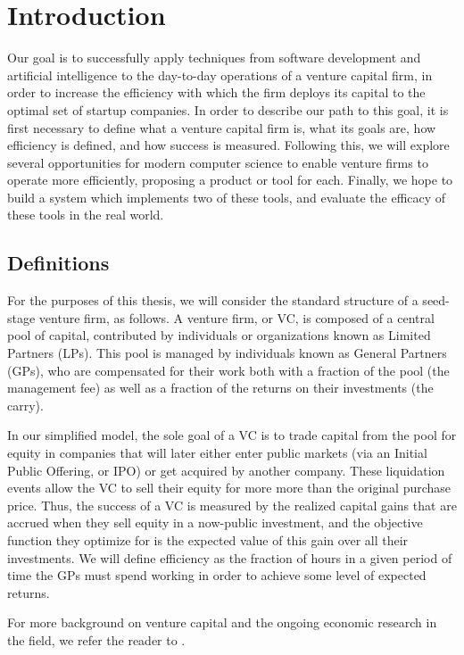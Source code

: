 \section{Introduction}

Our goal is to successfully apply techniques from software development and artificial intelligence to the day-to-day operations of a venture capital firm, in order to increase the efficiency with which the firm deploys its capital to the optimal set of startup companies. In order to describe our path to this goal, it is first necessary to define what a venture capital firm is, what its goals are, how efficiency is defined, and how success is measured. Following this, we will explore several opportunities for modern computer science to enable venture firms to operate more efficiently, proposing a product or tool for each. Finally, we hope to build a system which implements two of these tools, and evaluate the efficacy of these tools in the real world.

\subsection{Definitions}

For the purposes of this thesis, we will consider the standard structure of a seed-stage venture firm, as follows. A venture firm, or VC, is composed of a central pool of capital, contributed by individuals or organizations known as Limited Partners (LPs). This pool is managed by individuals known as General Partners (GPs), who are compensated for their work both with a fraction of the pool (the management fee) as well as a fraction of the returns on their investments (the carry).

In our simplified model, the sole goal of a VC is to trade capital from the pool for equity in companies that will later either enter public markets (via an Initial Public Offering, or IPO) or get acquired by another company. These liquidation events allow the VC to sell their equity for more more than the original purchase price. Thus, the success of a VC is measured by the realized capital gains that are accrued when they sell equity in a now-public investment, and the objective function they optimize for is the expected value of this gain over all their investments. We will define efficiency as the fraction of hours in a given period of time the GPs must spend working in order to achieve some level of expected returns.

For more background on venture capital and the ongoing economic research in the field, we refer the reader to \cite{venture-survey}.

